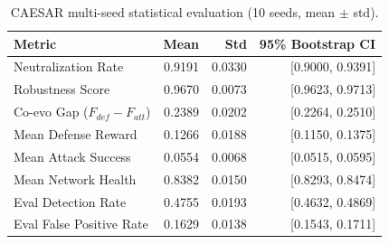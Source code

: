 \begin{table}[htbp]
  \centering
  \caption{CAESAR multi-seed statistical evaluation (10 seeds, mean $\pm$ std).}
  \label{tab:statistical}
  \begin{tabular}{@{} l rrr @{}}
    \toprule
    Metric & Mean & Std & 95\% Bootstrap CI \\
    \midrule
    Neutralization Rate & 0.9191 & 0.0330 & [0.9000, 0.9391] \\
    Robustness Score & 0.9670 & 0.0073 & [0.9623, 0.9713] \\
    Co-evo Gap ($F_{def}-F_{att}$) & 0.2389 & 0.0202 & [0.2264, 0.2510] \\
    Mean Defense Reward & 0.1266 & 0.0188 & [0.1150, 0.1375] \\
    Mean Attack Success & 0.0554 & 0.0068 & [0.0515, 0.0595] \\
    Mean Network Health & 0.8382 & 0.0150 & [0.8293, 0.8474] \\
    Eval Detection Rate & 0.4755 & 0.0193 & [0.4632, 0.4869] \\
    Eval False Positive Rate & 0.1629 & 0.0138 & [0.1543, 0.1711] \\
    \bottomrule
  \end{tabular}
\end{table}
